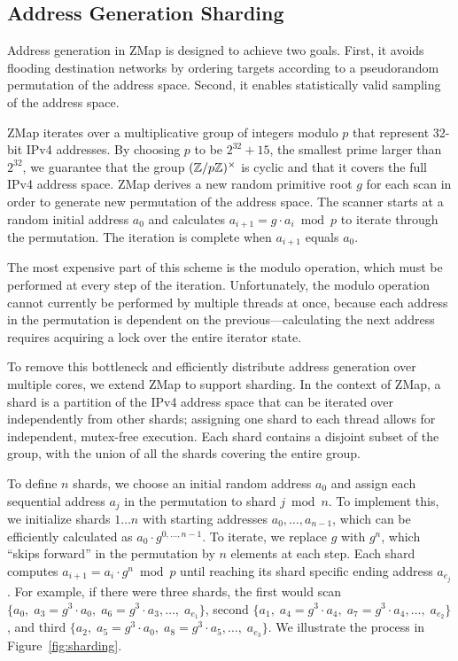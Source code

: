 \subsection{Address Generation Sharding}

Address generation in ZMap is designed to achieve two goals. First, it avoids
flooding destination networks by ordering targets according to a pseudorandom
permutation of the address space. Second, it enables statistically valid
sampling of the address space.

ZMap iterates over a multiplicative group of integers modulo $p$ that
represent 32-bit IPv4 addresses. By choosing $p$ to be $2^{32} + 15$, the
smallest prime larger than $2^{32}$, we guarantee that the group
$(\mathbb{Z}/p\mathbb{Z})^{\times}$ is cyclic and that it covers the full IPv4 address
space. ZMap derives a new random primitive root $g$ for each scan in order to
generate new permutation of the address space. The scanner starts at a random
initial address $a_{0}$ and calculates $a_{i+1} = g \cdot a_{i} \bmod p$ to
iterate through the permutation. The iteration is complete when $a_{i+1}$
equals $a_{0}$.

The most expensive part of this scheme is the modulo operation, which must be
performed at every step of the iteration. Unfortunately, the modulo operation
cannot currently be performed by multiple threads at once, because each
address in the permutation is dependent on the previous---calculating the
next address requires acquiring a lock over the entire iterator state.

To remove this bottleneck and efficiently distribute address generation over
multiple cores, we extend ZMap to support sharding. In the context of ZMap, a
shard is a partition of the IPv4 address space that can be iterated over
independently from other shards; assigning one shard to each thread allows
for independent, mutex-free execution. Each shard contains a disjoint subset
of the group, with the union of all the shards covering the entire group.

To define $n$ shards, we choose an initial random address $a_0$ and assign
each sequential address $a_j$ in the permutation to shard $j \bmod n$. To
implement this, we initialize shards $1 \dots n$ with starting addresses
$a_0,\dots,a_{n-1}$, which can be efficiently calculated as $a_0 \cdot
g^{0,\dots,n-1}$. To iterate, we replace $g$ with $g^n$, which ``skips
forward'' in the permutation by $n$ elements at each step. Each shard
computes $a_{i+1} = a_i \cdot g^n \bmod p$ until reaching its shard specific
ending address $a_{e_j}$. For example, if there were three shards, the first
would scan
$\{ {a_0,\; a_3=g^3 \cdot a_0,\; a_6 = g^3 \cdot a_3,\dots,\; a_{e_1}} \}$,
second
$\{ {a_1,\; a_4=g^3 \cdot a_4,\; a_7 = g^3 \cdot a_4,\dots,\; a_{e_2}} \}$, 
and third 
$\{ {a_2,\; a_5=g^3 \cdot a_0,\; a_8 = g^3 \cdot a_5,\dots,\; a_{e_3}} \}$. 
We illustrate the process in Figure~\ref{fig:sharding}.

